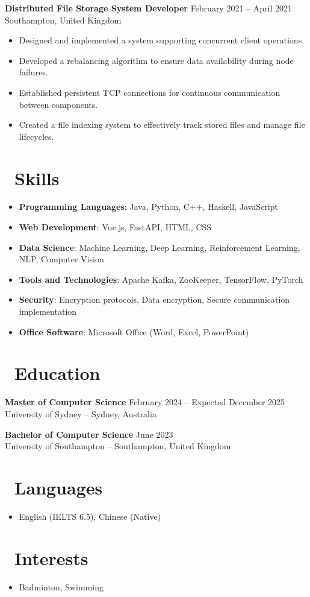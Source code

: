 \documentclass[a4paper,10pt]{article}
\begin{document}
\textbf{Distributed File Storage System Developer} \hfill February 2021 – April 2021 \\
Southampton, United Kingdom
\begin{itemize}[noitemsep,topsep=0pt]
    \item Designed and implemented a system supporting concurrent client operations.
    \item Developed a rebalancing algorithm to ensure data availability during node failures.
    \item Established persistent TCP connections for continuous communication between components.
    \item Created a file indexing system to effectively track stored files and manage file lifecycles.
\end{itemize}

\section*{\faTools\ Skills}
\begin{itemize}[noitemsep,topsep=0pt]
    \item \textbf{Programming Languages}: Java, Python, C++, Haskell, JavaScript
    \item \textbf{Web Development}: Vue.js, FastAPI, HTML, CSS
    \item \textbf{Data Science}: Machine Learning, Deep Learning, Reinforcement Learning, NLP, Computer Vision
    \item \textbf{Tools and Technologies}: Apache Kafka, ZooKeeper, TensorFlow, PyTorch
    \item \textbf{Security}: Encryption protocols, Data encryption, Secure communication implementation
    \item \textbf{Office Software}: Microsoft Office (Word, Excel, PowerPoint)
\end{itemize}

\section*{\faGraduationCap\ Education}
\textbf{Master of Computer Science} \hfill February 2024 – Expected December 2025 \\
University of Sydney – Sydney, Australia

\textbf{Bachelor of Computer Science} \hfill June 2023 \\
University of Southampton – Southampton, United Kingdom

\section*{\faLanguage\ Languages}
\begin{itemize}[noitemsep,topsep=0pt]
    \item English (IELTS 6.5), Chinese (Native)
\end{itemize}

\section*{\faFutbol\ Interests}
\begin{itemize}[noitemsep,topsep=0pt]
    \item Badminton, Swimming
\end{itemize}
\end{document}
